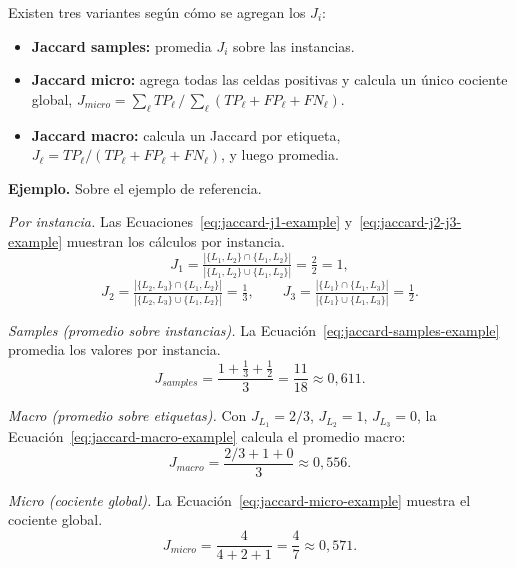 \documentclass[12pt,oneside]{report}
\begin{document}
Existen tres variantes según cómo se agregan los $J_i$:
\begin{itemize}[leftmargin=*]
  \item \textbf{Jaccard samples:} promedia $J_i$ sobre las instancias.
  \item \textbf{Jaccard micro:} agrega todas las celdas positivas y
  calcula un único cociente global, $J_{micro}=\sum_\ell TP_\ell\,/\,\sum_\ell(TP_\ell+FP_\ell+FN_\ell)$.
  \item \textbf{Jaccard macro:} calcula un Jaccard por etiqueta,
  $J_\ell=TP_\ell/(TP_\ell+FP_\ell+FN_\ell)$, y luego promedia.
\end{itemize}

\textbf{Ejemplo.} Sobre el ejemplo de referencia.

\emph{Por instancia.} Las Ecuaciones~\eqref{eq:jaccard-j1-example} y~\eqref{eq:jaccard-j2-j3-example} muestran los cálculos por instancia.
\begin{equation}
\label{eq:jaccard-j1-example}
J_1=\tfrac{|\{L_1,L_2\}\cap\{L_1,L_2\}|}{|\{L_1,L_2\}\cup\{L_1,L_2\}|}=\tfrac{2}{2}=1,
\end{equation}
\begin{equation}
\label{eq:jaccard-j2-j3-example}
J_2=\tfrac{|\{L_2,L_3\}\cap\{L_1,L_2\}|}{|\{L_2,L_3\}\cup\{L_1,L_2\}|}=\tfrac{1}{3},\qquad
J_3=\tfrac{|\{L_1\}\cap\{L_1,L_3\}|}{|\{L_1\}\cup\{L_1,L_3\}|}=\tfrac{1}{2}.
\end{equation}

\emph{Samples (promedio sobre instancias).} La Ecuación~\eqref{eq:jaccard-samples-example} promedia los valores por instancia.
\begin{equation}
\label{eq:jaccard-samples-example}
J_{samples}=\frac{1+\tfrac{1}{3}+\tfrac{1}{2}}{3}=\frac{11}{18}\approx 0{,}611.
\end{equation}

\emph{Macro (promedio sobre etiquetas).} Con $J_{L_1}=2/3$,
$J_{L_2}=1$, $J_{L_3}=0$, la Ecuación~\eqref{eq:jaccard-macro-example} calcula el promedio macro:
\begin{equation}
\label{eq:jaccard-macro-example}
J_{macro}=\frac{2/3+1+0}{3}\approx 0{,}556.
\end{equation}

\emph{Micro (cociente global).} La Ecuación~\eqref{eq:jaccard-micro-example} muestra el cociente global.
\begin{equation}
\label{eq:jaccard-micro-example}
J_{micro}=\frac{4}{4+2+1}=\frac{4}{7}\approx 0{,}571.
\end{equation}
\end{document}
